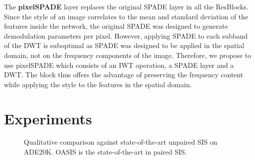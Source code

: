 \documentclass{article}
\begin{document}
The {\bf pixelSPADE} layer replaces the original SPADE layer in all the ResBlocks. Since the style of an image correlates to the mean and standard deviation of the features inside the network, the original SPADE was designed to generate demodulation parameters per pixel. However, applying SPADE to each subband of the DWT is suboptimal as SPADE was designed to be applied in the spatial domain, not on the frequency components of the image. Therefore, we propose to use pixelSPADE which consists of an IWT operation, a SPADE layer and a DWT. The block thus offers the advantage of preserving the frequency content while applying the style to the features in the spatial domain.
\vspace{-1.5em}
\section{Experiments}
\label{sec:experiments}
\vspace{-1em}
\begin{figure*}[t]
    \captionsetup[subfloat]{position=top, labelformat=empty, skip=0pt}

    \begin{minipage}{\textwidth}
     \hfill
     \hfill
     \hfill
     \hfill
     \hfill
    \vspace{-1em}
     \hfill
     \hfill
     \hfill
     \hfill
     \hfill
    \vfill
    \end{minipage}
   \caption{Qualitative comparison against state-of-the-art unpaired SIS on ADE20K. OASIS is the state-of-the-art in paired SIS.}
   \vspace{-1.5em}
   \label{fig:ade20k_paper_results}
\end{figure*}
\end{document}
